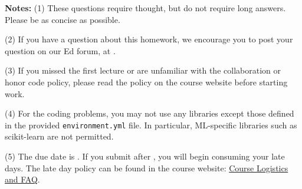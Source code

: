 {\bf Notes:} 
(1) These questions require thought, but do not require long
answers. Please be as concise as possible.  

(2) If you have a question
about this homework, we encourage you to post your question on our
Ed forum, at \edstem. 

(3) If you
missed the first lecture or are unfamiliar with the collaboration or honor
code policy, please read the policy on the course website before starting work.

(4) For the coding problems, you may not
use any libraries except those defined in the provided \texttt{environment.yml}
file. In particular, ML-specific libraries such as scikit-learn are not
permitted. 

(5) The due date is \due. If you submit after
\due, you will begin consuming your
late days. The late day policy can be found in the course website:  \href{https://docs.google.com/document/d/1WxzSBGMwYWS6rb9h38Z9VZwnwgiNgW4g/edit?usp=sharing&ouid=107123596178400324439&rtpof=true&sd=true}{Course Logistics and FAQ}.

